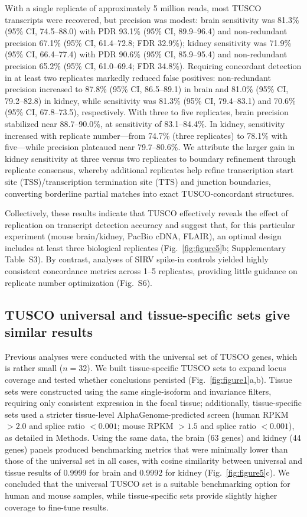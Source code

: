 \documentclass[pdflatex,sn-nature]{sn-jnl}%
\begin{document}
With a single replicate of approximately 5 million reads, most TUSCO transcripts were recovered, but precision was modest: brain sensitivity was 81.3\% (95\% CI, 74.5--88.0) with PDR 93.1\% (95\% CI, 89.9--96.4) and non-redundant precision 67.1\% (95\% CI, 61.4--72.8; FDR 32.9\%); kidney sensitivity was 71.9\% (95\% CI, 66.4--77.4) with PDR 90.6\% (95\% CI, 85.9--95.4) and non-redundant precision 65.2\% (95\% CI, 61.0--69.4; FDR 34.8\%). Requiring concordant detection in at least two replicates markedly reduced false positives: non-redundant precision increased to 87.8\% (95\% CI, 86.5--89.1) in brain and 81.0\% (95\% CI, 79.2--82.8) in kidney, while sensitivity was 81.3\% (95\% CI, 79.4--83.1) and 70.6\% (95\% CI, 67.8--73.5), respectively. With three to five replicates, brain precision stabilized near 88.7--90.0\%, at sensitivity of 83.1--84.4\%. In kidney, sensitivity increased with replicate number---from 74.7\% (three replicates) to 78.1\% with five---while precision plateaued near 79.7--80.6\%. We attribute the larger gain in kidney sensitivity at three versus two replicates to boundary refinement through replicate consensus, whereby additional replicates help refine transcription start site (TSS)/transcription termination site (TTS) and junction boundaries, converting borderline partial matches into exact TUSCO-concordant structures.

Collectively, these results indicate that TUSCO effectively reveals the effect of replication on transcript detection accuracy and suggest that, for this particular experiment (mouse brain/kidney, PacBio cDNA, FLAIR), an optimal design includes at least three biological replicates (Fig.~\ref{fig:figure5}b; Supplementary Table~S3). By contrast, analyses of SIRV spike-in controls yielded highly consistent concordance metrics across 1--5 replicates, providing little guidance on replicate number optimization (Fig.~S6).

\subsection{TUSCO universal and tissue-specific sets give similar results}

Previous analyses were conducted with the universal set of TUSCO genes, which is rather small ($n = 32$). We built tissue-specific TUSCO sets to expand locus coverage and tested whether conclusions persisted (Fig.~\ref{fig:figure1}a,b). Tissue sets were constructed using the same single-isoform and invariance filters, requiring only consistent expression in the focal tissue; additionally, tissue-specific sets used a stricter tissue-level AlphaGenome-predicted screen (human RPKM $> 2.0$ and splice ratio $< 0.001$; mouse RPKM $> 1.5$ and splice ratio $< 0.001$), as detailed in Methods. Using the same data, the brain (63 genes) and kidney (44 genes) panels produced benchmarking metrics that were minimally lower than those of the universal set in all cases, with cosine similarity between universal and tissue results of 0.9999 for brain and 0.9992 for kidney (Fig.~\ref{fig:figure5}c). We concluded that the universal TUSCO set is a suitable benchmarking option for human and mouse samples, while tissue-specific sets provide slightly higher coverage to fine-tune results.
\end{document}
